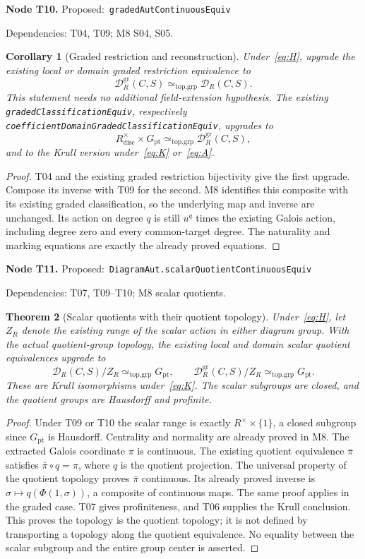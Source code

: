 \documentclass[11pt]{article}
\newtheorem{theorem}{Theorem}[section]
\newtheorem{corollary}[theorem]{Corollary}
\theoremstyle{remark}\newtheorem{remark}[theorem]{Remark}
\newcommand{\D}{\mathcal D}
\newcommand{\DG}{\mathcal D^{\mathrm{gr}}}
\newcommand{\code}[1]{{\normalfont\nolinkurl{#1}}}
\newcommand{\node}[3]{\par\Needspace{8\baselineskip}\smallskip\noindent\textbf{Node #1.}\quad
 \textsf{Proposed:}\ \code{#2}\par\noindent
 \textsf{Dependencies:} #3.\par\smallskip}
\begin{document}
\node{T10}{gradedAutContinuousEquiv}{T04, T09; M8 S04, S05}
\begin{corollary}[Graded restriction and reconstruction]\label{cor:t10}
Under~\eqref{eq:H}, upgrade the existing local or domain graded
restriction equivalence to
\[
                 \DG_R(C,S)\simeq_{\mathrm{top.grp}}\D_R(C,S).
\]
This statement needs no additional field-extension hypothesis. The
existing \code{gradedClassificationEquiv}, respectively
\code{coefficientDomainGradedClassificationEquiv}, upgrades to
\[
       R^\times_{\mathrm{disc}}\times G_{\mathrm{pt}}
                            \simeq_{\mathrm{top.grp}}\DG_R(C,S),
\]
and to the Krull version under~\eqref{eq:K} or~\eqref{eq:A}.
\end{corollary}
\begin{proof}
T04 and the existing graded restriction bijectivity give the first
upgrade. Compose its inverse with T09 for the second. M8 identifies
this composite with its existing graded classification, so the
underlying map and inverse are unchanged. Its action on degree $q$
is still $u^q$ times the existing Galois action, including degree zero
and every common-target degree. The naturality and marking equations
are exactly the already proved equations.
\end{proof}

\node{T11}{DiagramAut.scalarQuotientContinuousEquiv}{T07, T09--T10; M8 scalar quotients}
\begin{theorem}[Scalar quotients with their quotient topology]\label{thm:t11}
Under~\eqref{eq:H}, let $Z_R$ denote the existing range of the scalar
action in either diagram group. With the actual quotient-group
topology, the existing local and domain scalar quotient equivalences
upgrade to
\[
             \D_R(C,S)/Z_R\simeq_{\mathrm{top.grp}}G_{\mathrm{pt}},
 \qquad      \DG_R(C,S)/Z_R\simeq_{\mathrm{top.grp}}G_{\mathrm{pt}}.
\]
These are Krull isomorphisms under~\eqref{eq:K}. The scalar subgroups
are closed, and the quotient groups are Hausdorff and profinite.
\end{theorem}
\begin{proof}
Under T09 or T10 the scalar range is exactly
$R^\times\times\{1\}$, a closed subgroup since $G_{\mathrm{pt}}$
is Hausdorff. Centrality and normality are already proved in M8.
The extracted Galois coordinate $\pi$ is continuous. The existing
quotient equivalence $\bar\pi$ satisfies $\bar\pi\circ q=\pi$,
where $q$ is the quotient projection. The universal property of the
quotient topology proves $\bar\pi$ continuous. Its already proved
inverse is $\sigma\mapsto q(\Phi(1,\sigma))$, a composite of
continuous maps. The same proof applies in the graded case. T07
gives profiniteness, and T06 supplies the Krull conclusion. This
proves the topology is the quotient topology; it is not defined by
transporting a topology along the quotient equivalence. No equality
between the scalar subgroup and the entire group center is asserted.
\end{proof}
\end{document}
